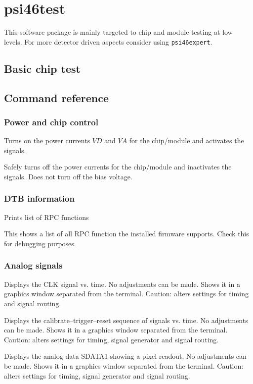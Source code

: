 \chapter{psi46test}

This software package is mainly targeted to chip and module testing at low levels. For more detector driven aspects consider using \texttt{psi46expert}.

\section{Basic chip test}

\section{Command reference}
\subsection{Power and chip control}
\begin{description}

    Turns on the power currents $VD$ and $VA$ for the chip/module and activates the signals.

    Safely turns off the power currents for the chip/module and inactivates the signals. Does not turn off the bias voltage.

\end{description}

\subsection{DTB information}
\begin{description}
     Prints list of RPC functions

    This shows a list of all RPC function the installed firmware supports. Check this for debugging purposes.
\end{description}

\subsection{Analog signals}
\begin{description}

    Displays the CLK signal vs. time. No adjustments can be made. Shows it in a graphics window separated from the terminal. Caution: alters settings for timing and signal routing.

    Displays the calibrate--trigger--reset sequence of signals vs. time. No adjustments can be made. Shows it in a graphics window separated from the terminal. Caution: alters settings for timing, signal generator and signal routing.

    Displays the analog data SDATA1 showing a pixel readout. No adjustments can be made. Shows it in a graphics window separated from the terminal. Caution: alters settings for timing, signal generator and signal routing.
\end{description}

